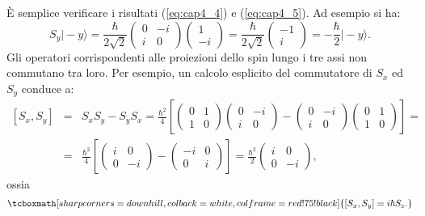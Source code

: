 \documentclass[a4paper,12pt,oneside]{book}
\begin{document}
È semplice verificare i risultati (\ref{eq:cap4_4}) e (\ref{eq:cap4_5}). Ad esempio si ha:
	\begin{equation}
		S_y \vert - y \rangle = \frac{\hbar}{2\sqrt{2}}\begin{pmatrix}
		0 & -i\\
		i & 0
		\end{pmatrix}
		\begin{pmatrix}
		1\\-i
		\end{pmatrix} = \frac{\hbar}{2\sqrt{2}} 
		\begin{pmatrix}
		-1 \\ i
		\end{pmatrix} = -\frac{\hbar}{2} \vert -y \rangle .
	\end{equation}
Gli operatori corrispondenti alle proiezioni dello spin lungo i tre assi non commutano tra loro. Per esempio, un calcolo esplicito del commutatore di $S_x$ ed $S_y$ conduce a:
	\begin{eqnarray}
		\left[ S_x , S_y \right] & = & S_x S_y-S_y S_x= 
		\frac{\hbar ^2}{4} \left[\begin{pmatrix}
		0 & 1\\
		1 & 0
		\end{pmatrix} \begin{pmatrix}
		0 & -i\\
		i & 0
		\end{pmatrix}- \begin{pmatrix}
		0 & -i\\
		i & 0
		\end{pmatrix}\begin{pmatrix}
		0 & 1\\
		1 & 0
		\end{pmatrix}
		\right] = \nonumber \\
		& = &\frac{\hbar ^2}{4} \left[\begin{pmatrix}
		i & 0\\
		0 & -i
		\end{pmatrix} - \begin{pmatrix}
		-i & 0\\
		0 & i
		\end{pmatrix}\right] = 	
		\frac{\hbar ^2}{2}\begin{pmatrix}
		i & 0\\
		0 & -i
		\end{pmatrix},
	\end{eqnarray}
ossia
	\begin{equation}
		\tcboxmath[sharp corners=downhill ,colback=white,colframe=red!75!black]{
			\left[ S_x, S_y \right] = i \hbar S_z.
			}
	\end{equation}
\end{document}
